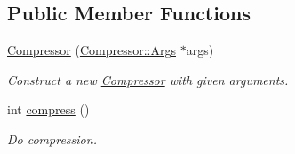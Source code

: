 \subsection*{Public Member Functions}
\begin{DoxyCompactItemize}
\item 
\hyperlink{classlossycompressor_1_1_compressor_a305e5f6f622f7ef30dc78b6fa68ee4e6}{Compressor} (\hyperlink{structlossycompressor_1_1_compressor_1_1_args}{Compressor\+::\+Args} $\ast$args)\hypertarget{classlossycompressor_1_1_compressor_a305e5f6f622f7ef30dc78b6fa68ee4e6}{}\label{classlossycompressor_1_1_compressor_a305e5f6f622f7ef30dc78b6fa68ee4e6}

\begin{DoxyCompactList}\small\item\em Construct a new \hyperlink{classlossycompressor_1_1_compressor}{Compressor} with given arguments. \end{DoxyCompactList}\item 
int \hyperlink{classlossycompressor_1_1_compressor_aeee9f851729d1754c608cc1052babde2}{compress} ()
\begin{DoxyCompactList}\small\item\em Do compression. \end{DoxyCompactList}\end{DoxyCompactItemize}
